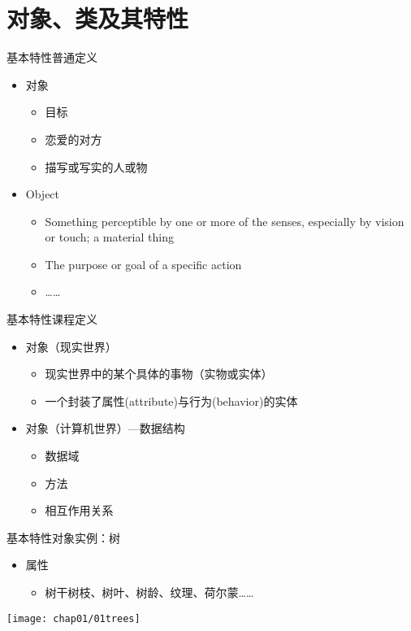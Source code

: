 \section[基本特性]{对象、类及其特性}\label{sec:chap01-sec01}
\begin{frame}{基本特性}{普通定义}
  \stretchon
  \begin{itemize}
  \item 对象
    \begin{itemize}
    \item 目标
    \item 恋爱的对方
    \item 描写或写实的人或物
    \end{itemize}
  \item Object
    \begin{itemize}
    \item Something perceptible by one or more of the senses,
      especially by vision or touch; a material thing
    \item The purpose or goal of a specific action
    \item \ldots\ldots
    \end{itemize}
  \end{itemize}
  \stretchoff
\end{frame}

\begin{frame}{基本特性}{课程定义}
  \stretchon
  \begin{itemize}
  \item 对象（现实世界）
    \begin{itemize}
    \item 现实世界中的某个具体的事物（实物或实体）
    \item 一个封装了属性(attribute)与行为(behavior)的实体
    \end{itemize}
  \item 对象（计算机世界）---\alert{数据结构}
    \begin{itemize}
    \item 数据域
    \item 方法
    \item 相互作用关系
    \end{itemize}
  \end{itemize}
  \stretchoff
\end{frame}

\begin{frame}{基本特性}{对象实例：树}
  \stretchon
  \begin{itemize}
  \item 属性
    \begin{itemize}
    \item 树干树枝、树叶、树龄、纹理、荷尔蒙\ldots\ldots
    \end{itemize}
  \end{itemize}
  \centering
    \texttt{[image: chap01/01trees]} %
  \stretchoff
\end{frame}

